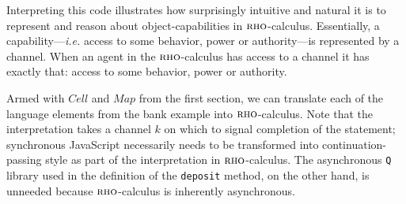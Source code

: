 \documentclass[]{acm_proc_article-sp}
\newcommand{\ldb}{[\![}
\newcommand{\rdb}{]\!]}
\newcommand{\id}[1]{\texttt{#1}}
\newcommand{\juxtap}{\mathbin{\id{|}}}
\newcommand{\binpar}[2]{#1 \juxtap #2}
\newcommand{\meaningof}[1]{\ldb #1 \rdb}
\newcommand{\defneqls}{\coloneqq}
\numberwithin{equation}{subsection}
\newcommand{\rhoc}{${\textsc{rho}}$-calculus}
\begin{document}
Interpreting this code illustrates how surprisingly intuitive and
natural it is to represent and reason about object-capabilities in
\rhoc. Essentially, a \\ capability---{\em i.e.} access to some behavior, power
or authority---is represented by a channel. When an agent in the \rhoc\;
has access to a channel it has exactly that: access to some behavior,
power or authority.


Armed with $Cell$ and $Map$ from the first section, we can translate
each of the language elements from the bank example into \rhoc.  Note
that the interpretation takes a channel $k$ on which to signal
completion of the statement; synchronous JavaScript necessarily needs
to be transformed into continuation-passing style as part of the
interpretation in {\rhoc}.  The asynchronous {\tt Q} library used in
the definition of the \texttt{deposit} method, on the other hand, is
unneeded because {\rhoc} is inherently asynchronous.
\end{document}
